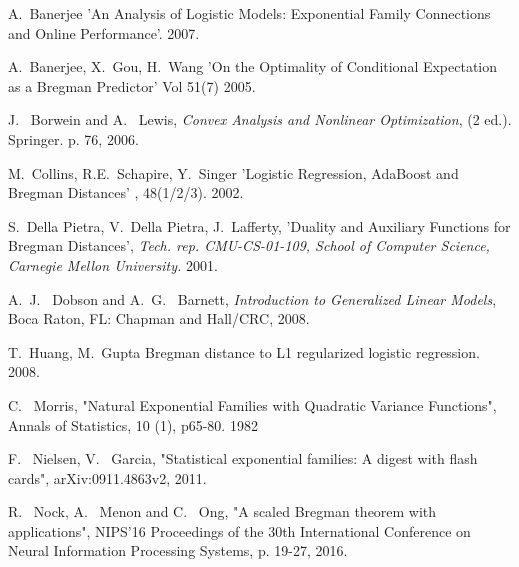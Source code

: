 \documentclass[BSc]{usydthesis}
\numberwithin{equation}{chapter}
\theoremstyle{remark}
\begin{document}
\begin{thebibliography}{10}

   {\sc  A.~Banerjee}
    \newblock 'An Analysis of Logistic Models:
Exponential Family Connections and Online Performance'.
    2007.  
    

    

    {\sc A.~Banerjee, X.~Gou, H.~Wang}
    \newblock  'On the Optimality of Conditional Expectation as a Bregman Predictor'
     Vol 51(7)
    2005.  
    
{\sc J.~ Borwein and A.~ Lewis}, {\em Convex Analysis and Nonlinear Optimization}, (2 ed.). Springer. p. 76, 2006.

   {\sc  M.~Collins, R.E.~Schapire, Y.~Singer}
    \newblock 'Logistic Regression, AdaBoost and Bregman Distances'
    , 48(1/2/3).
    2002.
    

    {\sc S.~Della Pietra, V.~Della Pietra, J.~Lafferty}, 'Duality and Auxiliary Functions for Bregman Distances', {\em Tech. rep. CMU-CS-01-109, School of Computer Science, Carnegie Mellon University.} 2001.
    
{\sc A.~J.~ Dobson and A.~G.~ Barnett}, {\em Introduction to Generalized Linear Models},  Boca Raton, FL: Chapman and Hall/CRC, 2008.


   {\sc  T.~Huang, M.~Gupta}
    \newblock Bregman distance to L1 regularized logistic regression.
    2008.  
    

{\sc C.~ Morris}, "Natural Exponential Families with Quadratic Variance Functions", Annals of Statistics,
10 (1), p65-80. 1982

{\sc F.~ Nielsen, V.~ Garcia}, "Statistical exponential families: A digest with flash cards", arXiv:0911.4863v2, 2011.

{\sc R.~ Nock, A.~ Menon and C.~ Ong}, "A scaled Bregman theorem with applications", NIPS'16 Proceedings of the 30th International Conference on Neural Information Processing Systems, p. 19-27, 2016. 




\end{thebibliography}
\end{document}
